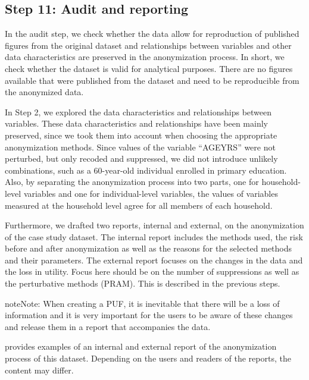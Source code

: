 \documentclass[letterpaper,10pt,english]{sphinxmanual}
\begin{document}
\subsection{Step 11: Audit and reporting}
\label{\detokenize{casestudies:id15}}
In the audit step, we check whether the data allow for reproduction of
published figures from the original dataset and relationships between
variables and other data characteristics are preserved in the
anonymization process. In short, we check whether the dataset is valid
for analytical purposes. There are no figures available that were
published from the dataset and need to be reproducible from the
anonymized data.

In Step 2, we explored the data characteristics and relationships
between variables. These data characteristics and relationships have
been mainly preserved, since we took them into account when choosing the
appropriate anonymization methods. Since values of the variable “AGEYRS”
were not perturbed, but only recoded and suppressed, we did not
introduce unlikely combinations, such as a 60-year-old individual
enrolled in primary education. Also, by separating the anonymization
process into two parts, one for household-level variables and one for
individual-level variables, the values of variables measured at the
household level agree for all members of each household.

Furthermore, we drafted two reports, internal and external, on the
anonymization of the case study dataset. The internal report includes
the methods used, the risk before and after anonymization as well as the
reasons for the selected methods and their parameters. The external
report focuses on the changes in the data and the loss in utility. Focus
here should be on the number of suppressions as well as the perturbative
methods (PRAM). This is described in the previous steps.

\begin{sphinxadmonition}{note}{Note:}
When creating a PUF, it is inevitable that there will be a loss of
information and it is very important for the users to be aware of these
changes and release them in a report that accompanies the data.
\end{sphinxadmonition}

provides examples of an internal and external report of the
anonymization process of this dataset. Depending on the users and
readers of the reports, the content may differ.
\end{document}
